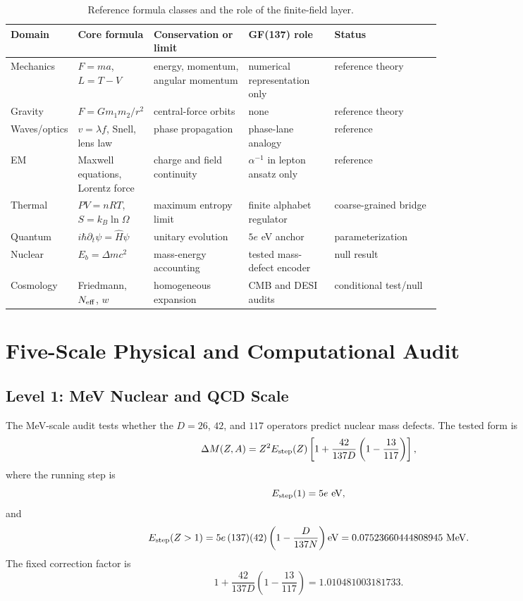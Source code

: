 \documentclass[11pt]{article}
\begin{document}
\begin{table}[h]
\centering
\caption{Reference formula classes and the role of the finite-field layer.}
\scriptsize
\setlength{\tabcolsep}{3pt}
\begin{tabularx}{\linewidth}{@{}P{0.12\linewidth}P{0.17\linewidth}P{0.22\linewidth}P{0.20\linewidth}Y@{}}
\toprule
Domain & Core formula & Conservation or limit & GF(137) role & Status \\
\midrule
Mechanics & $F=ma$, $L=T-V$ & energy, momentum, angular momentum & numerical representation only & reference theory \\
Gravity & $F=Gm_1m_2/r^2$ & central-force orbits & none & reference theory \\
Waves/optics & $v=\lambda f$, Snell, lens law & phase propagation & phase-lane analogy & reference \\
EM & Maxwell equations, Lorentz force & charge and field continuity & $\alpha^{-1}$ in lepton ansatz only & reference \\
Thermal & $PV=nRT$, $S=k_B\ln\Omega$ & maximum entropy limit & finite alphabet regulator & coarse-grained bridge \\
Quantum & $i\hbar\partial_t\psi=\hat{H}\psi$ & unitary evolution & $5e$ eV anchor & parameterization \\
Nuclear & $E_b=\Delta mc^2$ & mass-energy accounting & tested mass-defect encoder & null result \\
Cosmology & Friedmann, $N_{\rm eff}$, $w$ & homogeneous expansion & CMB and DESI audits & conditional test/null \\
\bottomrule
\end{tabularx}
\end{table}

\section{Five-Scale Physical and Computational Audit}

\subsection{Level 1: MeV Nuclear and QCD Scale}

The MeV-scale audit tests whether the $D=26$, $42$, and $117$ operators
predict nuclear mass defects.  The tested form is
\begin{equation}
    \Delta M(Z,A)
    =
    Z^2E_{\rm step}(Z)
    \left[
        1+\frac{42}{137D}\left(1-\frac{13}{117}\right)
    \right],
\end{equation}
where the running step is
\begin{equation}
    E_{\rm step}(1)=5e~{\rm eV},
\end{equation}
and
\begin{equation}
    E_{\rm step}(Z>1)
    =
    5e\,(137)(42)
    \left(1-\frac{D}{137N}\right){\rm eV}
    =
    0.07523660444808945~{\rm MeV}.
\end{equation}
The fixed correction factor is
\begin{equation}
    1+\frac{42}{137D}\left(1-\frac{13}{117}\right)
    =
    1.010481003181733.
\end{equation}
\end{document}
